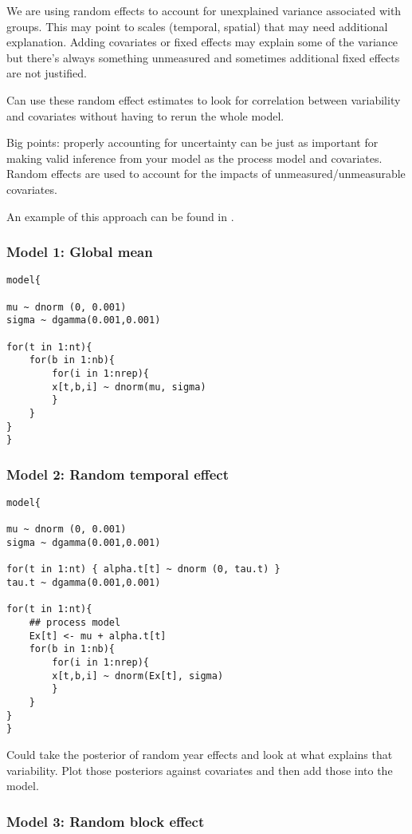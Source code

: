 \documentclass[12pt, oneside]{article}   	%
\begin{document}
We are using random effects to account for unexplained variance associated with groups. This may point to scales (temporal, spatial) that may need additional explanation. Adding covariates or fixed effects may explain some of the variance but there's always something unmeasured and sometimes additional fixed effects are not justified.

Can use these random effect estimates to look for correlation between variability and covariates without having to rerun the whole model. 

Big points: properly accounting for uncertainty can be just as important for making valid inference from your model as the process model and covariates. Random effects are used to account for the impacts of unmeasured/unmeasurable covariates. 

An example of this approach can be found in \cite{dietze2008}.

\subsubsection{Model 1: Global mean}

\begin{lstlisting}
model{

mu ~ dnorm (0, 0.001)
sigma ~ dgamma(0.001,0.001)

for(t in 1:nt){
	for(b in 1:nb){
		for(i in 1:nrep){
		x[t,b,i] ~ dnorm(mu, sigma)
		}
	}
}
}
\end{lstlisting}

\subsubsection{Model 2: Random temporal effect}

\begin{lstlisting}
model{

mu ~ dnorm (0, 0.001)
sigma ~ dgamma(0.001,0.001)

for(t in 1:nt) { alpha.t[t] ~ dnorm (0, tau.t) }
tau.t ~ dgamma(0.001,0.001)

for(t in 1:nt){
	## process model
	Ex[t] <- mu + alpha.t[t]
	for(b in 1:nb){
		for(i in 1:nrep){
		x[t,b,i] ~ dnorm(Ex[t], sigma)
		}
	}
}
}
\end{lstlisting}

Could take the posterior of random year effects and look at what explains that variability. Plot those posteriors against covariates and then add those into the model.

\subsubsection{Model 3: Random block effect}
\end{document}
